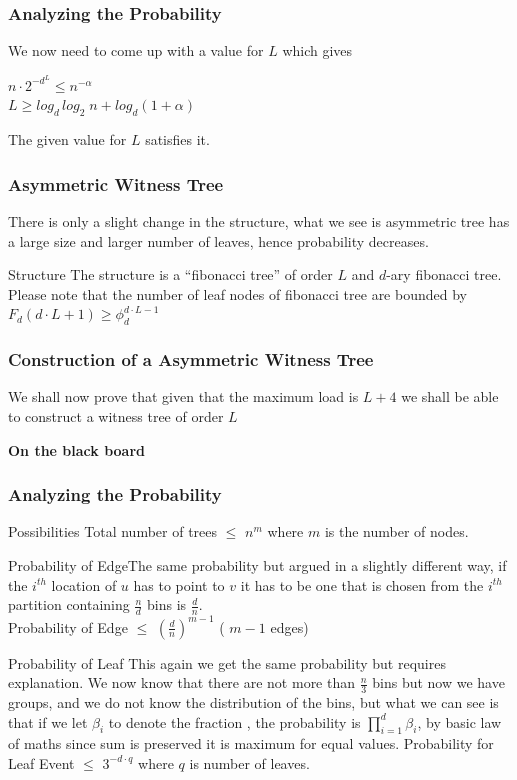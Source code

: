 \documentclass{beamer}
\begin{document}
\begin{frame}
\frametitle{Analyzing the Probability}
We now need to come up with a value for $L$  which gives \\
\begin{center} 
$ n \cdot 2^{-d^L} \leq n^{- \alpha}$ \\
$L \geq log_d \, log_2  \; n + log_d(1+\alpha)$
\end{center}
The given value for $L$ satisfies it. 
\end{frame}


\begin{frame}
\frametitle{Asymmetric Witness Tree}
There is only a slight change in the structure, what we see is asymmetric tree has a large size and larger number of leaves, hence probability decreases. 
\begin{block}
{Structure}
The structure is a ``fibonacci tree'' of order $L$ and $d$-ary fibonacci tree. Please note that the number of leaf nodes of fibonacci tree are bounded by $F_d(d \cdot L+ 1) \geq \phi_d^{d \cdot L-1}$ 
\end{block}

\end{frame}

\begin{frame}
\frametitle{Construction of a Asymmetric Witness Tree}
We shall now prove that given that the maximum load is $L+4$ we shall be able to construct a witness tree of order $L$
\begin{center}
 \textbf{On the black board}
\end{center}
\end{frame}

\begin{frame}
\frametitle{Analyzing the Probability}
\begin{block}
{Possibilities} Total number of trees $\leq$ $n^m$ where $m$ is the number of nodes. 
\end{block}
\begin{block}
{Probability of Edge}The same probability but argued in a slightly different way, if the $i^{th}$ location of $u$ has to point to $v$ it has to be one that is chosen from the $i^{th}$ partition containing $\frac{n}{d}$ bins is $\frac{d}{n}$. \\
Probability of Edge $\leq$ $\left( \frac{d}{n} \right) ^{m-1}$ ( $m-1$ edges) 
\end{block}
\begin{block}
{Probability of Leaf} This again we get the same probability but requires explanation. We now know that there are not more than $\frac{n}{3}$ bins but now we have groups, and we do not know the distribution of the bins, but what we can see is that if we let $\beta_i$ to denote the fraction , the probability is $\prod_{i=1}^{d} \beta_i$, by basic law of maths since sum is preserved it is maximum for equal values. 
Probability for Leaf Event $\leq$ $3^{-d \cdot q}$ where $q$ is number of leaves. 
\end{block}
\end{frame}
\end{document}
